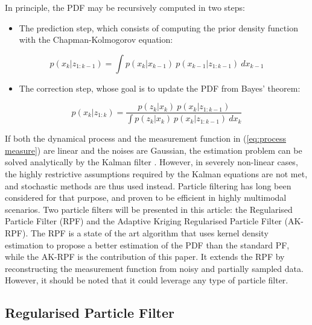 \documentclass[conference]{IEEEtran}
\begin{document}
In principle, the PDF may be recursively computed in two steps:
\begin{itemize}
\item The prediction step, which consists of computing the prior density function with the Chapman-Kolmogorov equation:
\end{itemize}
\begin{equation}
p(x_k|z_{1:k-1}) = \int p(x_k|x_{k-1}) \: p(x_{k-1}|z_{1:k-1}) \: dx_{k-1}
\end{equation}
\begin{itemize}
\item The correction step, whose goal is to update the PDF from Bayes' theorem:
\end{itemize}
\begin{equation}
p(x_k|z_{1:k}) = \frac{p(z_k|x_k) \: p(x_k|z_{1:k-1})}{\int p(z_k|x_k) \: p(x_k|z_{1:k-1}) \: dx_k} \label{eq:correction}
\end{equation}

If both the dynamical process and the measurement function in (\ref{eq:process measure}) are linear and the noises are Gaussian, the estimation problem can be solved analytically by the Kalman filter \cite{bib:Ristic}. However, in severely non-linear cases, the highly restrictive assumptions required by the Kalman equations are not met, and stochastic methods are thus used instead. Particle filtering has long been considered for that purpose, and proven to be efficient in highly multimodal scenarios. Two particle filters will be presented in this article: the Regularised Particle Filter (RPF) \cite{bib:RPF} and the Adaptive Kriging Regularised Particle Filter (AK-RPF). The RPF is a state of the art algorithm that uses kernel density estimation to propose a better estimation of the PDF than the standard PF, while the AK-RPF is the contribution of this paper. It extends the RPF by reconstructing the measurement function from noisy and partially sampled data. However, it should be noted that it could leverage any type of particle filter.

\subsection{Regularised Particle Filter}
\end{document}
